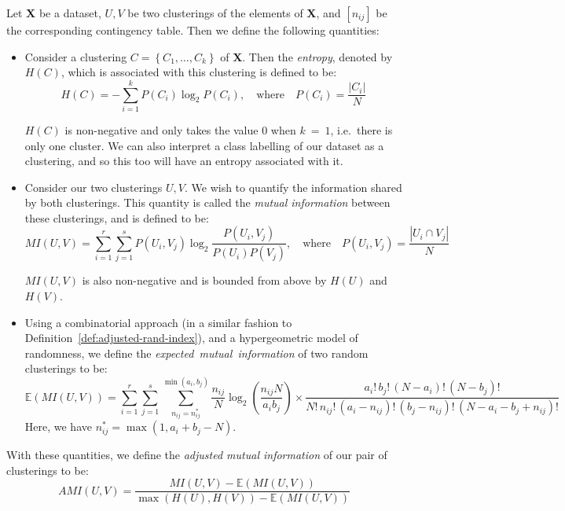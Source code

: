 \begin{definition}\label{def:adjusted-mutual-info}
    Let \textbf{X} be a dataset, \(U, V\) be two clusterings of the elements of
    \textbf{X}, and \(\left[n_{ij}\right]\) be the corresponding contingency
    table. Then we define the following quantities:
    \begin{itemize}
        \item Consider a clustering \(C = \left\{C_1, \ldots, C_k\right\}\) of
            \textbf{X}. Then the \emph{entropy}, denoted by \(H(C)\), which is
            associated with this clustering is defined to be:
            \[
                H(C) = - \sum_{i=1}^k P(C_i)\log_2 P(C_i), \quad \text{where}
                \quad P(C_i) = \frac{\left|C_i\right|}{N}
            \]

            \(H(C)\) is non-negative and only takes the value \(0\) when
            \(k~=~1\), i.e.\ there is only one cluster. We can also interpret a
            class labelling of our dataset as a clustering, and so this too will
            have an entropy associated with it.

        \item Consider our two clusterings \(U, V\). We wish to quantify the
            information shared by both clusterings. This quantity is called the
            \emph{mutual information} between these clusterings, and is defined
            to be:
            \[
                MI(U, V) = \sum_{i=1}^r \sum_{j=1}^s P(U_i, V_j)\log_2
                \frac{P(U_i, V_j)}{P(U_i)P(V_j)}, \quad \text{where} \quad P(U_i,
                V_j) = \frac{\left|U_i \cap V_j\right|}{N}
            \]

            \(MI(U, V)\) is also non-negative and is bounded from above by
            \(H(U)\) and \(H(V)\).

        \item Using a combinatorial approach (in a similar fashion to
            Definition~\ref{def:adjusted-rand-index}), and a hypergeometric
            model of randomness, we define the
            \emph{expected~mutual~information} of two random clusterings to be:
            \[
                \mathbb{E}\left(MI(U, V)\right) = \sum_{i=1}^r \sum_{j=1}^s
                \sum_{n_{ij}=n_{ij}^*}^{\min(a_i, b_j)} \frac{n_{ij}}{N}\log_2
                \left(\frac{n_{ij} N}{a_i b_j}\right) \times \frac{a_i!\, b_j!\,
                \left(N - a_i\right)!\, \left(N - b_j\right)!}{N!\, n_{ij}!\,
                \left(a_i - n_{ij}\right)!\, \left(b_j - n_{ij}\right)!\,
                \left(N - a_i - b_j + n_{ij}\right)!}
            \]
            Here, we have \(n_{ij}^* = \max(1, a_i + b_j - N)\).\\
    \end{itemize}
    
    With these quantities, we define the \emph{adjusted mutual information} of
    our pair of clusterings to be:
    \[
        AMI(U, V) = \frac{MI(U, V) - \mathbb{E}\left(MI(U, V)\right)}{\max
        \left(H(U), H(V)\right) - \mathbb{E}\left(MI(U, V)\right)}
    \]
\end{definition}

